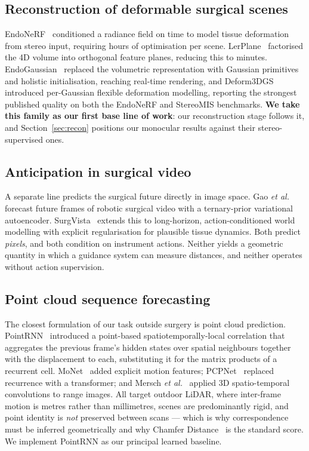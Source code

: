 \documentclass[conference]{IEEEtran}
\begin{document}
\subsection{Reconstruction of deformable surgical scenes}
EndoNeRF~\cite{wang2022endonerf} conditioned a radiance field on time to model
tissue deformation from stereo input, requiring hours of optimisation per scene.
LerPlane~\cite{ruan2023lerplane} factorised the 4D volume into orthogonal feature
planes, reducing this to minutes. EndoGaussian~\cite{liu2024endogaussian} replaced
the volumetric representation with Gaussian primitives and holistic
initialisation, reaching real-time rendering, and
Deform3DGS~\cite{yang2024deform3dgs} introduced per-Gaussian flexible deformation
modelling, reporting the strongest published quality on both the EndoNeRF and
StereoMIS benchmarks. \textbf{We take this family as our first base line of
work}: our reconstruction stage follows it, and Section~\ref{sec:recon} positions
our monocular results against their stereo-supervised ones.

\subsection{Anticipation in surgical video}
A separate line predicts the surgical future directly in image space. Gao
\textit{et al.}~\cite{gao2021futureframe} forecast future frames of robotic
surgical video with a ternary-prior variational autoencoder.
SurgVista~\cite{pan2026surgvista} extends this to long-horizon, action-conditioned
world modelling with explicit regularisation for plausible tissue dynamics. Both
predict \emph{pixels}, and both condition on instrument actions. Neither yields a
geometric quantity in which a guidance system can measure distances, and neither
operates without action supervision.

\subsection{Point cloud sequence forecasting}
The closest formulation of our task outside surgery is point cloud prediction.
PointRNN~\cite{fan2019pointrnn} introduced a point-based spatiotemporally-local
correlation that aggregates the previous frame's hidden states over spatial
neighbours together with the displacement to each, substituting it for the matrix
products of a recurrent cell. MoNet~\cite{lu2021monet} added explicit motion
features; PCPNet~\cite{luo2023pcpnet} replaced recurrence with a transformer; and
Mersch \textit{et al.}~\cite{mersch2021selfsupervised} applied 3D spatio-temporal
convolutions to range images. All target outdoor LiDAR, where inter-frame motion
is metres rather than millimetres, scenes are predominantly rigid, and point
identity is \emph{not} preserved between scans --- which is why correspondence must
be inferred geometrically and why Chamfer Distance~\cite{fan2017pointset} is the
standard score. We implement PointRNN as our principal learned baseline.
\end{document}
